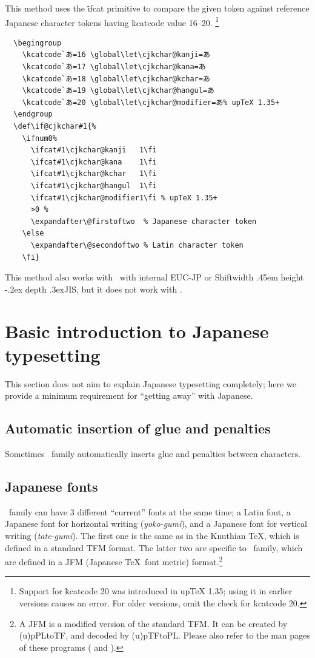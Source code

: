 \documentclass[a4paper,11pt,dvipdfmx]{article}
\def\Foreign#1{\textit{#1}}
\def\_{\leavevmode\vrule width .45em height -.2ex depth .3ex\relax}
\begin{document}
This method uses the \.{ifcat} primitive to compare the given token against
reference Japanese character tokens having \.{kcatcode} value 16--20.%
\footnote{Support for \.{kcatcode} 20 was introduced in upTeX 1.35;
using it in earlier versions causes an error. For older versions,
omit the check for \.{kcatcode} 20.}
\begin{verbatim}
  \begingroup
    \kcatcode`あ=16 \global\let\cjkchar@kanji=あ
    \kcatcode`あ=17 \global\let\cjkchar@kana=あ
    \kcatcode`あ=18 \global\let\cjkchar@kchar=あ
    \kcatcode`あ=19 \global\let\cjkchar@hangul=あ
    \kcatcode`あ=20 \global\let\cjkchar@modifier=あ% upTeX 1.35+
  \endgroup
  \def\if@cjkchar#1{%
    \ifnum0%
      \ifcat#1\cjkchar@kanji   1\fi
      \ifcat#1\cjkchar@kana    1\fi
      \ifcat#1\cjkchar@kchar   1\fi
      \ifcat#1\cjkchar@hangul  1\fi
      \ifcat#1\cjkchar@modifier1\fi % upTeX 1.35+
      >0 %
      \expandafter\@firstoftwo  % Japanese character token
    \else
      \expandafter\@secondoftwo % Latin character token
    \fi}
\end{verbatim}
This method also works with \upTeX\ with internal EUC-JP or Shift\_JIS,
but it does not work with \pTeX.

\section{Basic introduction to Japanese typesetting}

This section does not aim to explain Japanese typesetting completely;
here we provide a minimum requirement for ``getting away'' with Japanese.

\subsection{Automatic insertion of glue and penalties}

Sometimes \pTeX\ family automatically inserts glue and penalties
between characters.

\subsection{Japanese fonts}\label{japanese-fonts}

\pTeX\ family can have 3 different ``current'' fonts at the same time;
a Latin font, a Japanese font for horizontal writing (\Foreign{yoko-gumi}),
and a Japanese font for vertical writing (\Foreign{tate-gumi}).
The first one is the same as in the Knuthian \TeX,
which is defined in a standard TFM format.
The latter two are specific to \pTeX\ family, which are defined
in a JFM (Japanese \TeX\ font metric) format.\footnote{%
A JFM is a modified version of the standard TFM.
It can be created by (u)pPLtoTF, and decoded by (u)pTFtoPL.
Please also refer to the man pages of these programs
( and ).}
\end{document}
